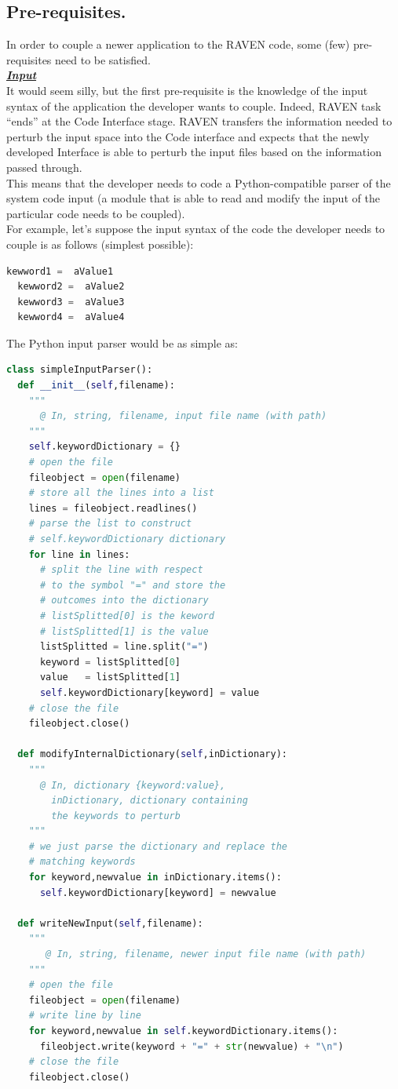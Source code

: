 \subsection{Pre-requisites.} 
\label{subsec:prerequisites}
In order to couple a newer application to the RAVEN code, some (few) pre-requisites need to be satisfied.
\newline
\\\textbf{\textit{\underline{Input}}}
\newline
\\ It would seem silly, but the first pre-requisite is the knowledge of the input 
syntax of the application the developer wants to couple. Indeed, RAVEN task
 ``ends'' at the Code Interface stage. RAVEN transfers the information needed 
 to perturb the input space into the Code interface and expects that the newly 
 developed Interface is able to perturb the input files based on the information 
 passed through.
\\This means that the developer needs to code a Python-compatible parser of
 the system code input (a module that is able to read and modify the input of 
 the particular code needs to be coupled).
\\ For example, let's suppose the input syntax of the code the developer needs 
to couple is as follows (simplest possible):
\begin{lstlisting}[language=python]
  kewword1 =  aValue1
  kewword2 =  aValue2
  kewword3 =  aValue3
  kewword4 =  aValue4
\end{lstlisting} 
The Python input parser would be as simple as:
\begin{lstlisting}[language=python]
class simpleInputParser():
  def __init__(self,filename):
    """ 
      @ In, string, filename, input file name (with path)
    """
    self.keywordDictionary = {}
    # open the file
    fileobject = open(filename)
    # store all the lines into a list
    lines = fileobject.readlines()
    # parse the list to construct 
    # self.keywordDictionary dictionary
    for line in lines:
      # split the line with respect
      # to the symbol "=" and store the
      # outcomes into the dictionary
      # listSplitted[0] is the keword
      # listSplitted[1] is the value
      listSplitted = line.split("=")
      keyword = listSplitted[0]
      value   = listSplitted[1]
      self.keywordDictionary[keyword] = value
    # close the file
    fileobject.close()
   
  def modifyInternalDictionary(self,inDictionary):
    """ 
      @ In, dictionary {keyword:value}, 
        inDictionary, dictionary containing
        the keywords to perturb 
    """
    # we just parse the dictionary and replace the
    # matching keywords
    for keyword,newvalue in inDictionary.items():
      self.keywordDictionary[keyword] = newvalue

  def writeNewInput(self,filename):
    """ 
       @ In, string, filename, newer input file name (with path)
    """
    # open the file
    fileobject = open(filename)
    # write line by line
    for keyword,newvalue in self.keywordDictionary.items():
      fileobject.write(keyword + "=" + str(newvalue) + "\n")
    # close the file
    fileobject.close()
\end{lstlisting} 
